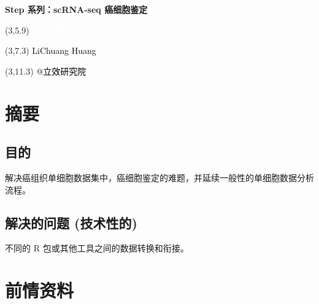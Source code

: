\documentclass[
]{article}
\author{}
\date{\vspace{-2.5em}}
\begin{document}
\begin{titlepage} 
\begin{center} \textbf{\Huge Step 系列：scRNA-seq
癌细胞鉴定} \vspace{4em}
\begin{textblock}{10}(3,5.9) \huge
\textbf{\textcolor{white}{2024-02-22}}
\end{textblock} \begin{textblock}{10}(3,7.3)
\Large \textcolor{black}{LiChuang Huang}
\end{textblock} \begin{textblock}{10}(3,11.3)
\Large \textcolor{black}{@立效研究院}
\end{textblock} \end{center} \end{titlepage}
\restoregeometry


\tableofcontents

\listoffigures

\listoftables

\newpage


\hypertarget{abstract}{%
\section{摘要}\label{abstract}}

\hypertarget{ux76eeux7684}{%
\subsection{目的}\label{ux76eeux7684}}

解决癌组织单细胞数据集中，癌细胞鉴定的难题，并延续一般性的单细胞数据分析流程。

\hypertarget{ux89e3ux51b3ux7684ux95eeux9898-ux6280ux672fux6027ux7684}{%
\subsection{解决的问题 (技术性的)}\label{ux89e3ux51b3ux7684ux95eeux9898-ux6280ux672fux6027ux7684}}

不同的 R 包或其他工具之间的数据转换和衔接。

\hypertarget{ux524dux60c5ux8d44ux6599}{%
\section{前情资料}\label{ux524dux60c5ux8d44ux6599}}
\end{document}
